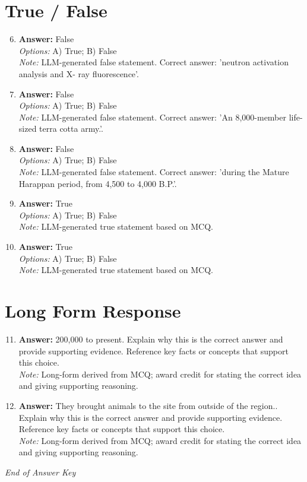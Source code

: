 \documentclass[12pt]{article}
\begin{document}
\section*{True / False}
\begin{enumerate}[label=\arabic*.]
\setcounter{enumi}{5}
\item \textbf{Answer:} False
\\ \textit{Options:} A) True; B) False
\\ \textit{Note:} LLM-generated false statement. Correct answer: 'neutron activation analysis and X- ray fluorescence'.
\item \textbf{Answer:} False
\\ \textit{Options:} A) True; B) False
\\ \textit{Note:} LLM-generated false statement. Correct answer: 'An 8,000-member life-sized terra cotta army.'.
\item \textbf{Answer:} False
\\ \textit{Options:} A) True; B) False
\\ \textit{Note:} LLM-generated false statement. Correct answer: 'during the Mature Harappan period, from 4,500 to 4,000 B.P.'.
\item \textbf{Answer:} True
\\ \textit{Options:} A) True; B) False
\\ \textit{Note:} LLM-generated true statement based on MCQ.
\item \textbf{Answer:} True
\\ \textit{Options:} A) True; B) False
\\ \textit{Note:} LLM-generated true statement based on MCQ.
\end{enumerate}

\section*{Long Form Response}
\begin{enumerate}[label=\arabic*.]
\setcounter{enumi}{10}
\item \textbf{Answer:} 200,000 to present. Explain why this is the correct answer and provide supporting
evidence. Reference key facts or concepts that support this choice.
\\ \textit{Note:} Long-form derived from MCQ; award credit for stating the correct idea and giving supporting reasoning.
\item \textbf{Answer:} They brought animals to the site from outside of the region.. Explain why this is the
correct answer and provide supporting evidence. Reference key facts or concepts that
support this choice.
\\ \textit{Note:} Long-form derived from MCQ; award credit for stating the correct idea and giving supporting reasoning.
\end{enumerate}

\vfill
\noindent\textit{End of Answer Key}
\end{document}
